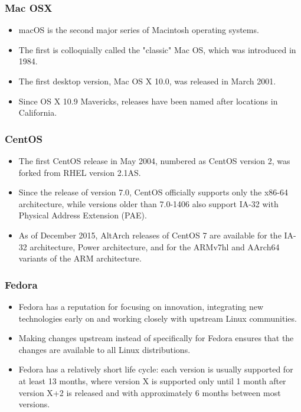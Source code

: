 \documentclass[10pt,    %
    english,            %
    xcolor=table,       %
    envcountsect        %
]{beamer}
\begin{document}
\begin{frame}
    \label{frm:second}
    \frametitle{Mac OSX} 
    
    \begin{itemize}
        \item macOS is the second major series of Macintosh operating systems.
        \item The first is colloquially called the "classic" Mac OS, which was introduced in 1984.
        \item The first desktop version, Mac OS X 10.0, was released in March 2001.
        \item Since OS X 10.9 Mavericks, releases have been named after locations in California.
    \end{itemize}
\end{frame}

\begin{frame}
    \label{frm:second}
    \frametitle{CentOS} 
    
    \begin{itemize}
        \item The first CentOS release in May 2004, numbered as CentOS version 2, was forked from RHEL version 2.1AS.
        \item Since the release of version 7.0, CentOS officially supports only the x86-64 architecture, while versions older than 7.0-1406 also support IA-32 with Physical Address Extension (PAE).
        \item As of December 2015, AltArch releases of CentOS 7 are available for the IA-32 architecture, Power architecture, and for the ARMv7hl and AArch64 variants of the ARM architecture.
    \end{itemize}
\end{frame}

\begin{frame}
    \label{frm:second}
    \frametitle{Fedora} 
    
    \begin{itemize}
        \item Fedora has a reputation for focusing on innovation, integrating new technologies early on and working closely with upstream Linux communities.
        \item Making changes upstream instead of specifically for Fedora ensures that the changes are available to all Linux distributions.
        \item Fedora has a relatively short life cycle: each version is usually supported for at least 13 months, where version X is supported only until 1 month after version X+2 is released and with approximately 6 months between most versions.
    \end{itemize}


\end{frame}
\end{document}
